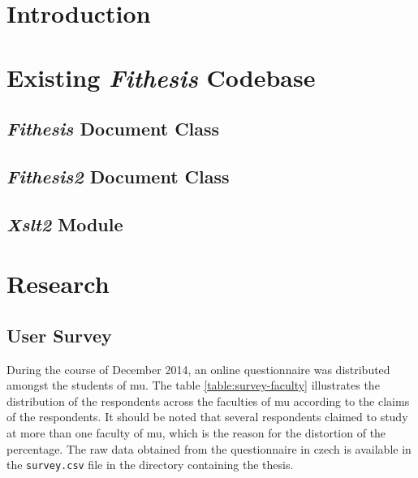   \begin{ThesisKeyWords}
    \blindtext
  \end{ThesisKeyWords}

  \tableofcontents
  \listoftables
  \listoffigures

  \MainMatter
  \chapter{Introduction}
    \blindtext

  \chapter{Existing \emph{Fithesis} Codebase}
    \blindtext
    
    \section{\emph{Fithesis} Document Class}
    \blindtext

    \section{\emph{Fithesis2} Document Class}
    \blindtext

    \section{\emph{Xslt2} Module}
    \blindtext

  \chapter{Research}
  \blindtext

    \section{User Survey}
    During the course of December 2014, an online questionnaire was distributed amongst the students of \gls{mu}. The table \ref{table:survey-faculty} illustrates the distribution of the respondents across the faculties of \gls{mu} according to the claims of the respondents. It should be noted that several respondents claimed to study at more than one faculty of \gls{mu}, which is the reason for the distortion of the percentage. The raw data obtained from the questionnaire in czech is available in the \texttt{survey.csv} file in the directory containing the thesis.


